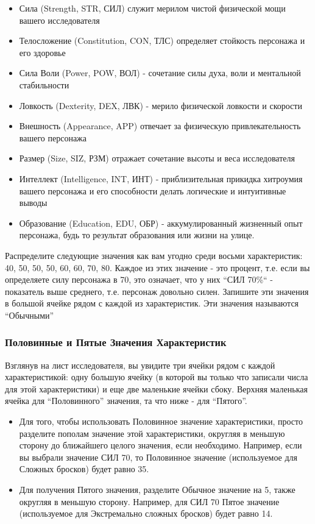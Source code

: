 \documentclass[letterpaper,twocolumn,openany, twoside, 11pt, usenames]{cocbook}
\begin{document}
\begin{itemize}[leftmargin=4mm]
  \item Сила (Strength, STR, СИЛ) служит мерилом чистой физической мощи вашего исследователя
  \item Телосложение (Constitution, CON, ТЛС) определяет стойкость персонажа и его здоровье
  \item Сила Воли (Power, POW, ВОЛ) - сочетание силы духа, воли и ментальной стабильности
  \item Ловкость (Dexterity, DEX, ЛВК) - мерило физической ловкости и скорости
  \item Внешность (Appearance, APP) отвечает за физическую привлекательность вашего персонажа
  \item Размер (Size, SIZ, РЗМ) отражает сочетание высоты и веса исследователя
  \item Интеллект (Intelligence, INT, ИНТ) - приблизительная прикидка хитроумия вашего персонажа и его способности делать логические и интуитивные выводы
  \item Образование (Education, EDU, ОБР) - аккумулированный жизненный опыт персонажа, будь то результат образования или жизни на улице.
\end{itemize}

Распределите следующие значения как вам угодно среди восьми характеристик: 40, 50, 50, 50, 60, 60, 70, 80. Каждое из этих значение - это процент, т.е. если вы определяете силу персонажа в 70, это означает, что у них ``СИЛ 70\%`` - показатель выше среднего, т.е. персонаж довольно силен. Запишите эти значения в большой ячейке рядом с каждой из характеристик. Эти значения называются ``Обычными''

\subsubsection*{\nohyphens{Половинные и Пятые Значения Характеристик}}

Взглянув на лист исследователя, вы увидите три ячейки рядом с каждой характеристикой: одну большую ячейку (в которой вы только что записали числа для этой характеристики) и еще две маленькие ячейки сбоку. Верхняя маленькая ячейка для ``Половинного'' значения, та что ниже - для ``Пятого''.

\begin{itemize}[leftmargin=4mm]
  \item Для того, чтобы использовать Половинное значение характеристики, просто разделите пополам значение этой характеристики, округляя в меньшую сторону до ближайшего целого значения, если необходимо. Например, если вы выбрали значение СИЛ 70, то Половинное значение (используемое для Сложных бросков) будет равно 35.
  \item Для получения Пятого значения, разделите Обычное значение на 5, также округляя в меньшую сторону. Например, для СИЛ 70 Пятое значение (используемое для Экстремально сложных бросков) будет равно 14.
\end{itemize}
\end{document}
